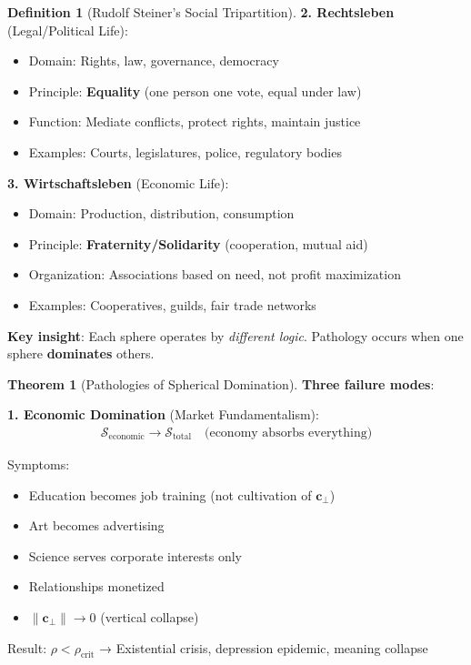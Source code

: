 \documentclass[11pt,a4paper]{article}
\theoremstyle{definition}
\newtheorem{definition}{Definition}[section]
\newtheorem{theorem}{Theorem}[section]
\theoremstyle{remark}
\newcommand{\cc}{\mathbf{c}}
\begin{document}
\begin{enumerate}
\begin{definition}[Rudolf Steiner's Social Tripartition]
\textbf{2. Rechtsleben} (Legal/Political Life):
\begin{itemize}
    \item Domain: Rights, law, governance, democracy
    \item Principle: \textbf{Equality} (one person one vote, equal under law)
    \item Function: Mediate conflicts, protect rights, maintain justice
    \item Examples: Courts, legislatures, police, regulatory bodies
\end{itemize}

\textbf{3. Wirtschaftsleben} (Economic Life):
\begin{itemize}
    \item Domain: Production, distribution, consumption
    \item Principle: \textbf{Fraternity/Solidarity} (cooperation, mutual aid)
    \item Organization: Associations based on need, not profit maximization
    \item Examples: Cooperatives, guilds, fair trade networks
\end{itemize}

\textbf{Key insight}: Each sphere operates by \textit{different logic}. Pathology occurs when one sphere \textbf{dominates} others.
\end{definition}

\begin{theorem}[Pathologies of Spherical Domination]
\textbf{Three failure modes}:

\textbf{1. Economic Domination} (Market Fundamentalism):
\begin{align}
\mathcal{S}_{\text{economic}} \to \mathcal{S}_{\text{total}} \quad \text{(economy absorbs everything)}
\end{align}

Symptoms:
\begin{itemize}
    \item Education becomes job training (not cultivation of \(\cc_\perp\))
    \item Art becomes advertising
    \item Science serves corporate interests only
    \item Relationships monetized
    \item \(\|\cc_\perp\| \to 0\) (vertical collapse)
\end{itemize}

Result: \(\rho < \rho_{\text{crit}}\) → Existential crisis, depression epidemic, meaning collapse


\end{theorem}
\end{enumerate}
\end{document}
